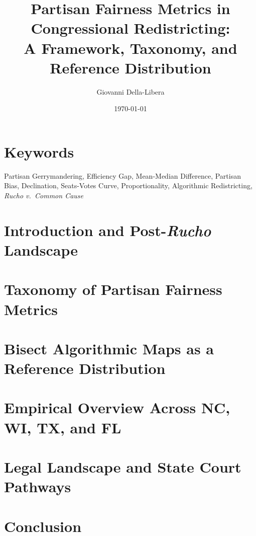 \documentclass[12pt]{article}
\title{\textbf{Partisan Fairness Metrics in Congressional Redistricting:\\
A Framework, Taxonomy, and Reference Distribution}}
\author{Giovanni Della-Libera}
\date{\today}
\begin{document}
\maketitle

\begin{abstract}

\end{abstract}

\section*{Keywords}
Partisan Gerrymandering, Efficiency Gap, Mean-Median Difference, Partisan Bias,
Declination, Seats-Votes Curve, Proportionality, Algorithmic Redistricting,
\textit{Rucho v.\ Common Cause}

\section{Introduction and Post-\textit{Rucho} Landscape}


\section{Taxonomy of Partisan Fairness Metrics}


\section{Bisect Algorithmic Maps as a Reference Distribution}


\section{Empirical Overview Across NC, WI, TX, and FL}


\section{Legal Landscape and State Court Pathways}


\section{Conclusion}




\end{document}
